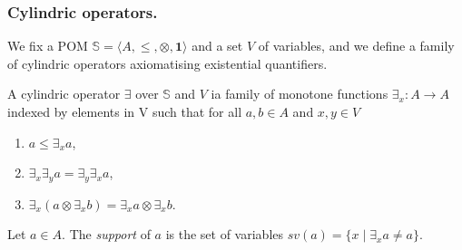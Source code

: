 \documentclass{llncs}
\newcommand{\comment}[1]{}
\def\monid{{\mathbf 0}}
\def\monop{\otimes}
\def\monid{\mathbf{1}}
\begin{document}
\comment{\smallskip
Our first step is the introduction of a technical notion that allows for 
factorising the common properties in the definition of the two families of operators.

\begin{definition}[pomonoid action]
\label{pomo}
Let $\mathbb{M} = \langle A, \leq, \monop, \monid \rangle$ be a partially ordered monoid and $\mathbb{P} = \langle S, \leq \rangle$ a partial order.
A pomonoid action of $\mathbb{M}$ on $\mathbb{P}$ is a function $\phi: A \times S \rightarrow S$ such that
	\begin{itemize}
	     \item $\forall s \in S.\ \phi(\monid, s) = s$,
         \item $\forall a, b \in A,\ s \in S.\ \phi(a, \phi(b, s)) = \phi(a \otimes b, s)$,
         \item $\forall a, b \in A,\ s, t \in S.\ a \leq b\, \wedge\, s \leq t \implies \phi(a, s) 
         \leq \phi (b, t)$.
	\end{itemize}
\end{definition}

The first two requirements just state
that $\phi$ is a monoid action of $\mathbb{M}$ on $S$, while the latter states that $\phi$ is monotone. Sometimes, we say that $\mathbb{P}$ is an $\mathbb{M}$-PO.}

\subsubsection{Cylindric operators.}
We fix a POM $\mathbb{S} = \langle A, \leq, \monop, \monid \rangle$
and a set $V$ of variables, and we define a family of cylindric operators axiomatising existential quantifiers.

\begin{definition}[cylindrification]\label{cyli}
	A cylindric operator $\exists$ over $\mathbb{S}$ and $V$ ia family of monotone functions
	$\exists_x : A \rightarrow A$ indexed by elements in V such that for all 
	$a, b \in A$ and $x, y \in V$
	\begin{enumerate}
	     \item $a \leq \exists_x a$,
         \item $\exists_x \exists_y a = \exists_y \exists_x a$,
	     \item $\exists_x (a \monop \exists_x b) = \exists_x a \monop \exists_x b$.
	\end{enumerate}
	
	\noindent Let $a \in A$. The \emph{support} of $a$ is the set of variables 
	$sv(a) = \{ x \mid \exists_x a \neq a\}$. 
\end{definition}
\end{document}
